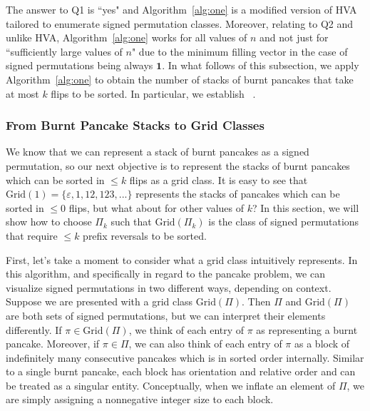 \documentclass{article}
\numberwithin{equation}{section}
\theoremstyle{definition}
\newcommand{\Grid}{\text{Grid}}
\begin{document}
The answer to Q1 is ``yes" and Algorithm~\ref{alg:one} is a modified version of HVA tailored to enumerate signed permutation classes. Moreover, relating to Q2 and unlike HVA, Algorithm~\ref{alg:one} works for all values of $n$ and not just for ``sufficiently large values of $n$" due to the minimum filling vector in the case of signed permutations being always $\mathbf{1}$. In what follows of this subsection, we apply Algorithm~\ref{alg:one} to obtain the number of stacks of burnt pancakes that take at most $k$ flips to be sorted. In particular, we establish ~\cite[Conjecture 6.2, 6.3]{BBP19Perm}. 


\subsubsection{From Burnt Pancake Stacks to Grid Classes}\label{sec:burnt}

We know that we can represent a stack of burnt pancakes as a signed permutation, so our next objective is to represent the stacks of burnt pancakes which can be sorted in $\leq k$ flips as a grid class.  It is easy to see that $\Grid(1) = \{\varepsilon, 1, 12, 123, ...\}$ represents the stacks of pancakes which can be sorted in $\leq 0$ flips, but what about for other values of $k$?  In this section, we will show how to choose $\Pi_k$ such that $\Grid(\Pi_k)$ is the class of signed permutations that require $\leq k$ prefix reversals to be sorted.

First, let's take a moment to consider what a grid class intuitively represents.  In this algorithm, and specifically in regard to the pancake problem, we can visualize signed permutations in two different ways, depending on context.  Suppose we are presented with a grid class $\Grid(\Pi)$. Then $\Pi$ and $\Grid(\Pi)$ are both sets of signed permutations, but we can interpret their elements differently.  If $\pi\in\Grid(\Pi)$, we think of each entry of $\pi$ as representing a burnt pancake.  Moreover, if $\pi\in\Pi$, we can also think of each entry of $\pi$ as a block of indefinitely many consecutive pancakes which is in sorted order internally.  Similar to a single burnt pancake, each block has orientation and relative order and can be treated as a singular entity.  Conceptually, when we inflate an element of $\Pi$, we are simply assigning a nonnegative integer size to each block.
\end{document}
